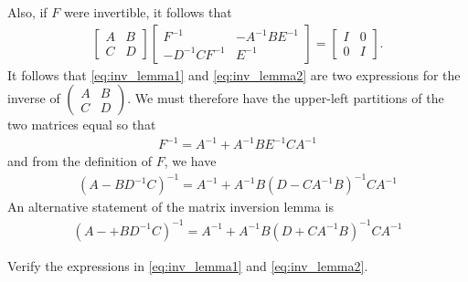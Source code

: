 %
Also, if $F$ were invertible, it follows that 
%
\begin{align}
\begin{bmatrix}
A & B \\ C & D
\end{bmatrix}
%
\begin{bmatrix}
F^{-1} & -A^{-1} B E^{-1} \\ -D^{-1} C F^{-1} & E^{-1}
\end{bmatrix}
=
\begin{bmatrix}
I & 0 \\ 0 & I
\end{bmatrix}.
\label{eq:inv_lemma2}
\end{align}
%
It follows that \eqref{eq:inv_lemma1} and \eqref{eq:inv_lemma2} are two expressions for the inverse of $\left(\begin{array}{cc}
A & B \\ C & D
\end{array}\right)$. We must therefore have the upper-left partitions of the two matrices equal so that 
%
\begin{align}
	F^{-1} = A^{-1} + A^{-1} B E^{-1} C A^{-1}
\end{align}
%
and from the definition of $F$, we have
%
\begin{align}
 \left(A - B D^{-1}C\right)^{-1} = A^{-1} + A^{-1} B \left(D - C A^{-1} B\right)^{-1} C A^{-1}
\end{align}
%
An alternative statement of the matrix inversion lemma is
%
\begin{align}
\left(A -+B D^{-1}C\right)^{-1} = A^{-1} + A^{-1} B \left(D + C A^{-1} B\right)^{-1} C A^{-1}
\end{align}
%
\begin{quiz}
	Verify the expressions in \eqref{eq:inv_lemma1} and \eqref{eq:inv_lemma2}.
\end{quiz}

